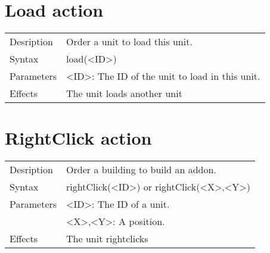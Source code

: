 \documentclass[english,11pt]{report}
\begin{document}
\section{Load action}
\begin{tabularx}{\textwidth}{lX}
 Desription & Order a unit to load this unit. \\
 Syntax & load(<ID>) \\
 Parameters & <ID>: The ID of the unit to load in this unit.\\
 Effects &  The unit loads another unit\\
\end{tabularx}

\section{RightClick action}
\begin{tabularx}{\textwidth}{lX}
 Desription & Order a building to build an addon. \\
 Syntax & rightClick(<ID>) or rightClick(<X>,<Y>) \\
 Parameters & <ID>: The ID of a unit.\\
            & <X>,<Y>: A position.\\
 Effects &  The unit rightclicks
\end{tabularx}
\end{document}
